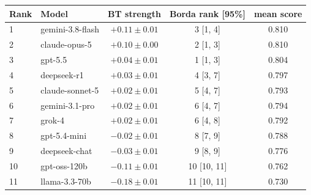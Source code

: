 \begin{tabular}{llccc}
\toprule
Rank & Model & BT strength & Borda rank [95\%] & mean score \\
\midrule
1 & gemini-3.8-flash & $+0.11 \pm 0.01$ & 3 [1, 4] & 0.810 \\
2 & claude-opus-5 & $+0.10 \pm 0.00$ & 2 [1, 3] & 0.810 \\
3 & gpt-5.5 & $+0.04 \pm 0.01$ & 1 [1, 3] & 0.804 \\
4 & deepseek-r1 & $+0.03 \pm 0.01$ & 4 [3, 7] & 0.797 \\
5 & claude-sonnet-5 & $+0.02 \pm 0.01$ & 5 [4, 7] & 0.793 \\
6 & gemini-3.1-pro & $+0.02 \pm 0.01$ & 6 [4, 7] & 0.794 \\
7 & grok-4 & $+0.02 \pm 0.01$ & 6 [4, 8] & 0.792 \\
8 & gpt-5.4-mini & $-0.02 \pm 0.01$ & 8 [7, 9] & 0.788 \\
9 & deepseek-chat & $-0.03 \pm 0.01$ & 9 [8, 9] & 0.776 \\
10 & gpt-oss-120b & $-0.11 \pm 0.01$ & 10 [10, 11] & 0.762 \\
11 & llama-3.3-70b & $-0.18 \pm 0.01$ & 11 [10, 11] & 0.730 \\
\bottomrule
\end{tabular}
